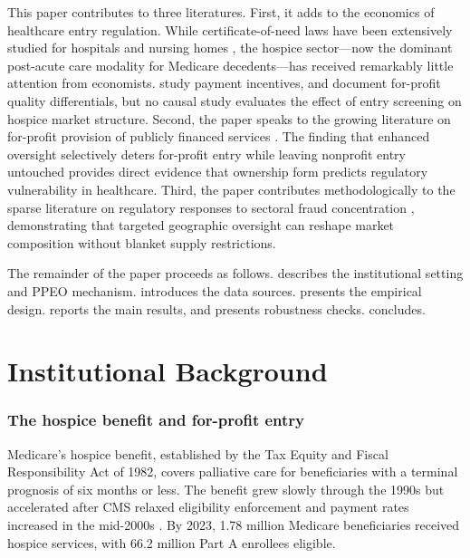 \documentclass[12pt]{article}
\begin{document}
This paper contributes to three literatures. First, it adds to the economics of healthcare entry regulation. While certificate-of-need laws have been extensively studied for hospitals \citep{conover2004certificate} and nursing homes \citep{grabowski2003effects, rahman2016effect}, the hospice sector---now the dominant post-acute care modality for Medicare decedents---has received remarkably little attention from economists. \citet{hackman2025hospice} study payment incentives, and \citet{stevenson2023forprofit} document for-profit quality differentials, but no causal study evaluates the effect of entry screening on hospice market structure. Second, the paper speaks to the growing literature on for-profit provision of publicly financed services \citep{duggan2004hospital, gupta2021does}. The finding that enhanced oversight selectively deters for-profit entry while leaving nonprofit entry untouched provides direct evidence that ownership form predicts regulatory vulnerability in healthcare. Third, the paper contributes methodologically to the sparse literature on regulatory responses to sectoral fraud concentration \citep{finkelstein2022health}, demonstrating that targeted geographic oversight can reshape market composition without blanket supply restrictions.

The remainder of the paper proceeds as follows.  describes the institutional setting and PPEO mechanism.  introduces the data sources.  presents the empirical design.  reports the main results, and  presents robustness checks.  concludes.


\section{Institutional Background}
\label{sec:background}

\subsubsection*{The hospice benefit and for-profit entry} Medicare's hospice benefit, established by the Tax Equity and Fiscal Responsibility Act of 1982, covers palliative care for beneficiaries with a terminal prognosis of six months or less. The benefit grew slowly through the 1990s but accelerated after CMS relaxed eligibility enforcement and payment rates increased in the mid-2000s \citep{aldridge2015trends}. By 2023, 1.78 million Medicare beneficiaries received hospice services, with 66.2 million Part A enrollees eligible.
\end{document}
